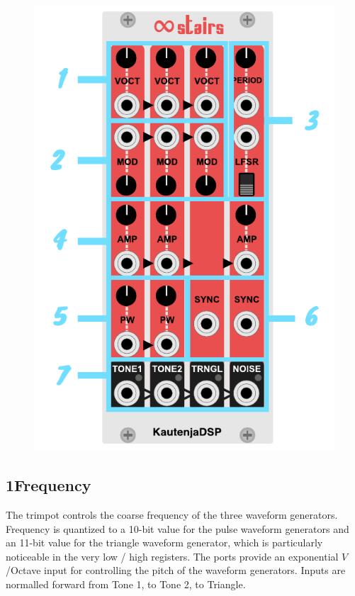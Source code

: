 \documentclass[12pt,letter]{article}
\begin{document}
\begin{figure}[!htp]
\centering
\includegraphics{Interface}
\end{figure}

\subsection*{1{\quad}Frequency}

The trimpot controls the coarse frequency of the three waveform generators. Frequency is quantized to a 10-bit value for the pulse waveform generators and an 11-bit value for the triangle waveform generator, which is particularly noticeable in the very low / high registers. The ports provide an exponential $V$/Octave input for controlling the pitch of the waveform generators. Inputs are normalled forward from Tone 1, to Tone 2, to Triangle.
\end{document}
